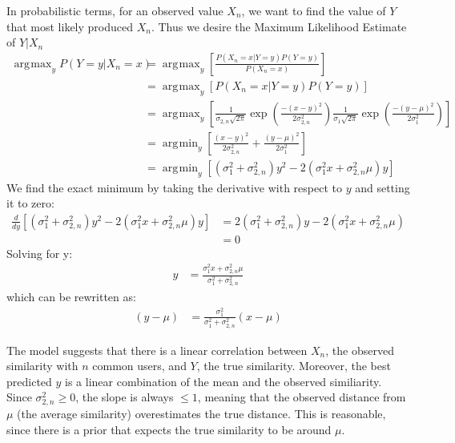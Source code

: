 \documentclass[11pt]{article}
\DeclareMathOperator*{\argmax}{arg\!\max}
\DeclareMathOperator*{\argmin}{arg\!\min}
\begin{document}
In probabilistic terms, for an observed value $X_n$, we want to find the value
of $Y$ that most likely produced $X_n$. Thus we desire the Maximum Likelihood
Estimate of $Y | X_n$
\begin{align}
\argmax_yP(Y=y|X_n=x) &= \argmax_y\left[\frac{P(X_n=x |
Y=y)P(Y=y)}{P(X_n=x)}\right]
\\&= \argmax_y\left[P(X_n=x|Y=y)P(Y=y)\right]
\\&= 
\argmax_y\left[\frac{1}{\sigma_{2,n}\sqrt{2\pi}}\exp{\left(\frac{-(x-y)^2}
{2\sigma_{2,n}^2}\right)}
\frac{1}{\sigma_{1}\sqrt{2\pi}}\exp{\left(\frac{-(y-\mu)^2}
{2\sigma_{1}^2}\right)}\right]
\\&= \argmin_y\left[\frac{(x-y)^2}{2\sigma_{2,n}^2} +
\frac{(y-\mu)^2}{2\sigma_{1}^2}\right]
\\&= \argmin_y\left[\left(\sigma_{1}^2+\sigma_{2,n}^2\right)y^2 - 
2\left(\sigma_{1}^2x+\sigma_{2,n}^2\mu\right)y\right]
\end{align}
We find the exact minimum by taking the derivative with respect to $y$ and
setting it to zero:
\begin{align}
\frac{d}{dy}\left[\left(\sigma_{1}^2+\sigma_{2,n}^2\right)y^2 - 
2\left(\sigma_{1}^2x+\sigma_{2,n}^2\mu\right)y\right]
&= 2\left(\sigma_{1}^2+\sigma_{2,n}^2\right)y - 
2\left(\sigma_{1}^2x+\sigma_{2,n}^2\mu\right) 
\\&= 0
\end{align}
Solving for y:
\begin{align}
y &= \frac{\sigma_{1}^2x+\sigma_{2,n}^2\mu}{\sigma_{1}^2+\sigma_{2,n}^2}
\end{align}
which can be rewritten as:
\begin{align}
\left(y - \mu\right) &= \frac{\sigma_{1}^2}{\sigma_{1}^2+\sigma_{2,n}^2}
\left(x-\mu\right)
\end{align}

The model suggests that there is a linear correlation between $X_n$, the
observed similarity with $n$ common users, and $Y$, the true similarity.
Moreover, the best predicted $y$ is a linear combination of the mean and the
observed similiarity. Since $\sigma_{2,n}^2\ge0$, the slope is always $\le1$, 
meaning that the observed distance from $\mu$ (the average similarity) 
overestimates the true distance. This is reasonable, since there is a prior 
that expects the true similarity to be around $\mu$.
\end{document}
